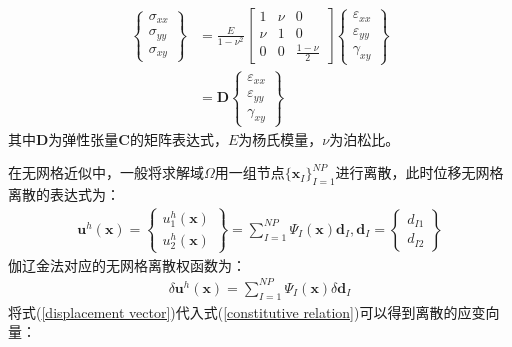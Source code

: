 \begin{equation}
\begin{split}
    \left\{\begin{matrix}
        \sigma_{xx}\\\sigma_{yy}\\\sigma_{xy}
        \end{matrix}\right\}&=\frac{E}{1-\nu^2}
        \left[\begin{matrix}
        1&\nu&0\\\nu&1&0\\0&0&\frac{1-\nu}{2}
        \end{matrix}\right]
        \left\{\begin{matrix}
        \varepsilon_{xx}\\\varepsilon_{yy}\\\gamma_{xy}
    \end{matrix}\right\}\\
    &=\pmb{D}\left\{\begin{matrix}\varepsilon_{xx}\\\varepsilon_{yy}\\\gamma_{xy}\end{matrix}\right\}
\end{split}
\end{equation}
其中$\pmb{D}$为弹性张量$\pmb{C}$的矩阵表达式，$E$为杨氏模量，$\nu$为泊松比。\par
在无网格近似中，一般将求解域$\Omega$用一组节点$\{\pmb{x}_I\}_{I=1}^{N\!P}$进行离散，此时位移无网格离散的表达式为：
\begin{equation}\label{displacement vector}
\begin{split}
    \pmb{u}^h(\pmb{x})=\left\{\begin{matrix}u_1^h(\pmb{x})\\u_2^h(\pmb{x})
    \end{matrix}\right\}=\sum_{I=1}^{N\!P}\Psi_I(\pmb{x})\pmb d_I,\pmb{d}_I=\left\{\begin{matrix}d_{I1}\\d_{I2}\end{matrix}\right\}
\end{split}
\end{equation}
伽辽金法对应的无网格离散权函数为：
\begin{equation}
\begin{split}
    \delta\pmb{u}^h(\pmb{x})=\sum_{I=1}^{N\!P}\Psi_I(\pmb{x})\delta\pmb{d}_I
\end{split}
\end{equation}
将式(\ref{displacement vector})代入式(\ref{constitutive relation})可以得到离散的应变向量：
